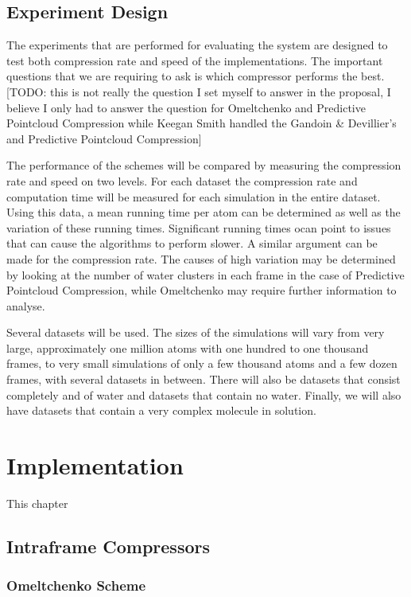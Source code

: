 \documentclass[a4paper,11pt]{report}
\begin{document}
\section{Experiment Design}

The experiments that are performed for evaluating the system are designed to test both compression rate and speed of the implementations. The important questions that we are requiring to ask is which compressor performs the best. [TODO: this is not really the question I set myself to answer in the proposal, I believe I only had to answer the question for Omeltchenko and Predictive Pointcloud Compression while Keegan Smith handled the Gandoin \& Devillier's and Predictive Pointcloud Compression]

The performance of the schemes will be compared by measuring the compression rate and speed on two levels. For each dataset the compression rate and computation time will be measured for each simulation in the entire dataset. Using this data, a mean running time per atom can be determined as well as the variation of these running times. Significant running times ocan point to issues that can cause the algorithms to perform slower. A similar argument can be made for the compression rate. The causes of high variation may be determined by looking at the number of water clusters in each frame in the case of Predictive Pointcloud Compression, while Omeltchenko may require further information to analyse.

Several datasets will be used. The sizes of the simulations will vary from very large, approximately one million atoms with one hundred to one thousand frames, to very small simulations of only a few thousand atoms and a few dozen frames, with several datasets in between. There will also be datasets that consist completely and of water and datasets that contain no water. Finally, we will also have datasets that contain a very complex molecule in solution.

\chapter{Implementation}

This chapter 




\section{Intraframe Compressors}

\subsection{Omeltchenko Scheme}
\end{document}
